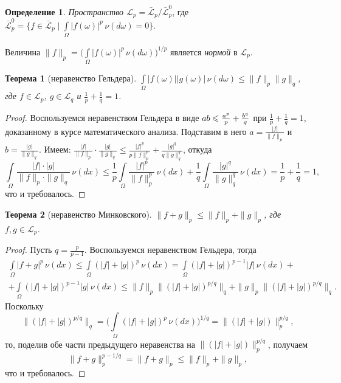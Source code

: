 \documentclass[12pt,titlepage]{article}
\newcounter{tema}
\newtheorem{theorem}{Теорема}[tema]
\theoremstyle{definition}
\newtheorem{defen}{Определение}[tema]
\newcommand*{\p}[1]{#1\nobreak\discretionary{}{\hbox{$\mathsurround=0pt #1$}}{}}
\begin{document}
\begin{defen}
\emph{Пространство
$\mathcal{L}_p=\mathcal{\bar{L}}_p/\mathcal{\bar{L}}_p^0$}, где
$\mathcal{\bar{L}}_p^0=\{f\in\mathcal{\bar{L}}_p\mid
\int\limits_\Omega\!|f(\omega)|^p\,\nu(d\omega)=0\}$.

Величина
$\|f\|_p=\big(\int\limits_\Omega\!|f(\omega)|^p\,\nu(d\omega)\big)^{1/p}$
является \emph{нормой} в $\mathcal{L}_p$.
\end{defen}

\begin{theorem}[неравенство Гельдера]
$\int\limits_\Omega\!|f(\omega)||g(\omega)|\,\nu(d\omega)\leqslant\|f\|_p\|g\|_q$,
где $f\in\mathcal{L}_p$, $g\in\mathcal{L}_q$ и $\frac 1 p+\frac 1
q=1$.
\end{theorem}

\begin{proof}
Воспользуемся неравенством Гельдера в виде
$ab\p\leqslant\frac{a^p}{p}\p+\frac{b^q}{q}$ при $\frac 1 p+\frac 1
q=1$, доказанному в курсе математического анализа. Подставим в него
$a=\frac{|f|}{\|f\|_p}$ и $b=\frac{|g|}{\|g\|_q}$. Имеем:
$\frac{|f|}{\|f\|_p}\cdot
\frac{|g|}{\|g\|_q}\leqslant\frac{|f|^p}{p\|f\|_p^p}+\frac{|g|^q}{q\|g\|_q^q}$,
откуда $$\int\limits_\Omega\!\frac{|f|\cdot|g|}{\|f\|_p\cdot
\|g\|_q}\,\nu(dx)\leqslant\frac 1
p\int\limits_\Omega\!\frac{|f|^p}{\|f\|_p^p}\,\nu(dx)+\frac 1
q\int\limits_\Omega\!\frac{|g|^q}{\|g\|_q^q}\,\nu(dx)=\frac 1
p+\frac 1 q=1,$$ что и требовалось.
\end{proof}

\begin{theorem}[неравенство Минковского]
$\|f+g\|_p\leqslant\|f\|_p+\|g\|_p$, где $f,g\in\mathcal{L}_p$.
\end{theorem}

\begin{proof}
Пусть $q=\frac{p}{p-1}$. Воспользуемся неравенством Гельдера, тогда
\begin{multline*}
\int\limits_\Omega\!|f+g|^p\,\nu(dx)\leqslant\int\limits_\Omega\!(|f|+|g|)^p\,\nu(dx)
=\int\limits_\Omega\!(|f|+|g|)^{p-1}|f|\,\nu(dx)+\\+\int\limits_\Omega\!(|f|+|g|)^{p-1}|g|
\,\nu(dx)\leqslant\|f\|_p\|(|f|+|g|)^{p/q}\|_q+\|g\|_p\|(|f|+|g|)^{p/q}\|_q.
\end{multline*}
Поскольку
$$\|(|f|+|g|)^{p/q}\|_q=\Big(\int\limits_\Omega\!(|f|+|g|)^{p}\,\nu(dx)\Big)^{1/q}=\|(|f|+|g|)\|_p^{p/q},$$
то, поделив обе части предыдущего неравенства на
$\|(|f|+|g|)\|_p^{p/q}$, получаем
$$\|f+g\|_p^{p-1/q}=\|f+g\|_p\leqslant\|f\|_p+\|g\|_p,$$ что и
требовалось.
\end{proof}
\end{document}
